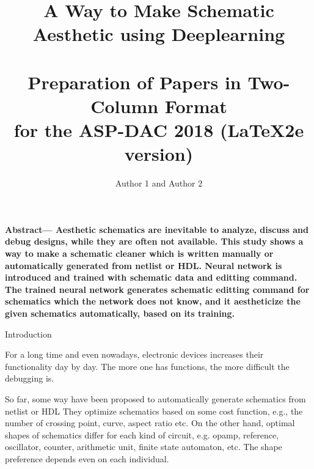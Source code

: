 \documentclass[twocolumn]{article}
\makeatletter
\def\section{\@startsection {section}{1}{\z@}{20pt plus 2pt minus 2pt}
{8pt plus 2pt minus 2pt}{\centering\normalsize\sc
\edef\@svsec{\thesection.\ }}}
\def\thesection{\Roman{section}}
\makeatother
\begin{document}
\date{}

\title{\Large\textbf{A Way to Make Schematic Aesthetic using Deeplearning}\\~\\
\large\textbf{
Preparation of Papers in Two-Column Format\\
for the ASP-DAC 2018 (\LaTeX2e version)}}	%


\author{Author 1 and Author 2}
\maketitle
\thispagestyle{empty}

{\small\textbf{Abstract---
 Aesthetic schematics are inevitable to analyze, discuss and debug designs,
while they are often not available.
 This study shows a way to make a schematic cleaner which is written manually
 or automatically generated from netlist or HDL.
 Neural network is introduced and trained with schematic data and
 editting command.
 The trained neural network generates schematic editting command for schematics
 which the network does not know, and it aestheticize the given schematics
 automatically, based on its training.
}}

\section{Introduction}

For a long time and even nowadays,
electronic devices increases their functionality day by day.
The more one has functions, the more difficult the debugging is.

So far, some way have been proposed to automatically generate schematics
from netlist or HDL 
\cite{nauts}
\cite{anshul}
\cite{fiduccia}
\cite{chun}
\cite{green}
\cite{tsung}
\cite{bogdan}
They optimize schematics based on some cost function, e.g.,
the number of crossing point, curve, aspect ratio etc.
On the other hand, optimal shapes of schematics differ for each kind of
circuit, e.g. opamp, reference, oscillator, counter, arithmetic unit,
finite state automaton, etc.
The shape preference depends even on each individual.
\end{document}
